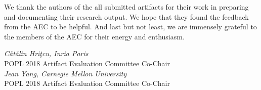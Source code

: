 We thank the authors of the all submitted artifacts for their work in preparing
and documenting their research output. We hope that they found the feedback from
the AEC to be helpful. And last but not least, we are immensely grateful to the
members of the AEC for their energy and enthusiasm.

\begin{flushright}
\textit{C\u{a}t\u{a}lin Hri\c{t}cu, Inria Paris} \\
POPL 2018 Artifact Evaluation Committee Co-Chair
\medskip \\
\textit{Jean Yang, Carnegie Mellon University} \\
POPL 2018 Artifact Evaluation Committee Co-Chair
\medskip \\
\end{flushright}

\newpage

